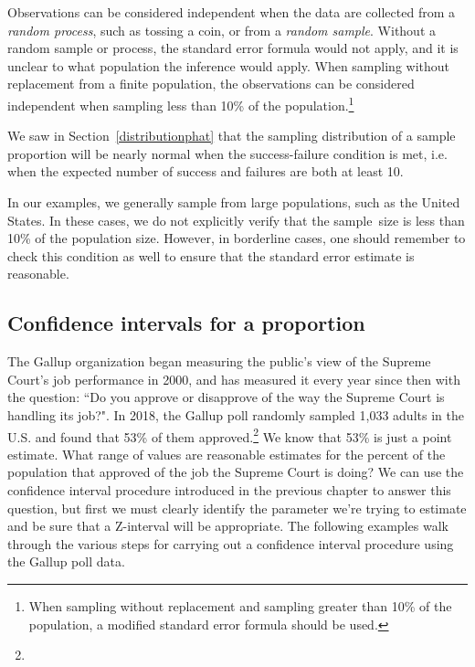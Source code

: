\begin{description}
\setlength{\itemsep}{0mm}
\item[Independent.] Observations can be considered independent when the data are collected from a \emph{random process}, such as tossing a coin, or from a \emph{random sample}.  Without a random sample or process, the standard error formula would not apply, and it is unclear to what population the inference would apply.  When sampling without replacement from a finite population, the observations can be considered independent when sampling less than 10\% of the population.\footnote{When sampling without replacement and sampling greater than 10\% of the population, a modified standard error formula should be used.}
\item[Nearly normal sampling distribution.] We saw in Section~\ref{distributionphat} that the sampling distribution of a sample proportion will be nearly normal when the success-failure condition is met, i.e. when the expected number of success and failures are both at least 10.  
\end{description}
In our examples, we generally sample from large populations, such as the United States.  In these cases, we do not explicitly verify that the sample~size is less than 10\% of the population size.  However, in borderline cases, one should remember to check this condition as well to ensure that the standard error estimate is reasonable.

\subsection{Confidence intervals for a proportion}
\label{confIntForPropSection}



The Gallup organization began measuring the public's view of the Supreme Court's job performance in 2000, and has measured it every year since then with the question: ``Do you approve or disapprove of the way the Supreme Court is handling its job?".  In 2018, the Gallup poll randomly sampled 1,033 adults in the U.S. and found that 53\% of them approved.\footnote{}  We know that 53\% is just a point estimate.  What range of values are reasonable estimates for the percent of the population that approved of the job the Supreme Court is doing?  We can use the confidence interval procedure introduced in the previous chapter to answer this question, but first we must clearly identify the parameter we're trying to estimate and be sure that a Z-interval will be appropriate.  The following examples walk through the various steps for carrying out a confidence interval procedure using the Gallup poll data.


